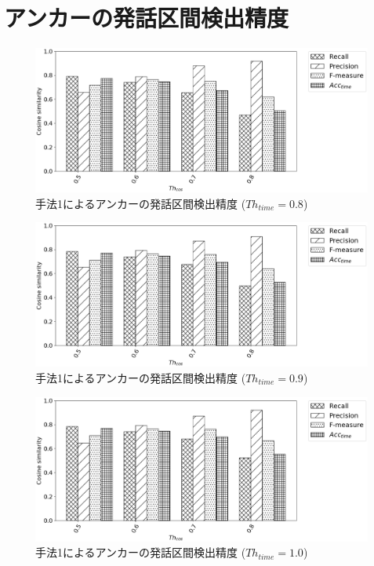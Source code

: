 
\chapter{アンカーの発話区間検出精度}
\begin{figure}[H]
  \begin{center}
    \includegraphics[scale=0.5]{./figure/prob1_08.eps}
  \end{center}
  \caption{手法1によるアンカーの発話区間検出精度 ($Th_{time}=0.8$)}
\end{figure}

\begin{figure}[H]
  \begin{center}
    \includegraphics[scale=0.5]{./figure/prob1_09.eps}
  \end{center}
  \caption{手法1によるアンカーの発話区間検出精度 ($Th_{time}=0.9$)}
\end{figure}

\begin{figure}[H]
  \begin{center}
    \includegraphics[scale=0.5]{./figure/prob1_10.eps}
  \end{center}
  \caption{手法1によるアンカーの発話区間検出精度 ($Th_{time}=1.0$)}
\end{figure}

